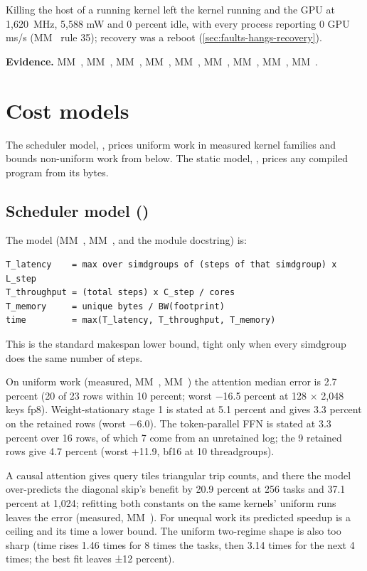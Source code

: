 Killing the host of a running kernel left the kernel running and the GPU at 1,620~MHz, 5,588 mW and 0 percent idle,
with every process reporting 0 GPU ms/s (MM~ rule 35); recovery was a reboot (\cref{sec:faults-hangs-recovery}).

\textbf{Evidence.} MM~, MM~, MM~, MM~, MM~, MM~, MM~, MM~, MM~.

\section{Cost models}\label{sec:cost-models-their}

The scheduler model, , prices uniform work in measured kernel families and bounds non-uniform work
from below. The static model, , prices any compiled program from its bytes.

\subsection*{Scheduler model ()}

The model (MM~, MM~, and the module docstring) is:

\begin{lstlisting}
T_latency    = max over simdgroups of (steps of that simdgroup) x L_step
T_throughput = (total steps) x C_step / cores
T_memory     = unique bytes / BW(footprint)
time         = max(T_latency, T_throughput, T_memory)
\end{lstlisting}

This is the standard makespan lower bound, tight only when every simdgroup does the same number of steps.

On uniform work (measured, MM~, MM~) the attention median error is 2.7 percent (20 of 23 rows within
10 percent; worst −16.5 percent at 128 × 2,048 keys fp8). Weight-stationary stage 1 is stated at 5.1 percent and gives
3.3 percent on the retained rows (worst −6.0). The token-parallel FFN is stated at 3.3 percent over 16 rows, of which 7
come from an unretained log; the 9 retained rows give 4.7 percent (worst +11.9, bf16 at 10 threadgroups).

A causal attention gives query tiles triangular trip counts, and there the model over-predicts the diagonal skip's
benefit by 20.9 percent at 256 tasks and 37.1 percent at 1,024; refitting both constants on the same kernels' uniform
runs leaves the error (measured, MM~). For unequal work its predicted speedup is a ceiling and its time a lower
bound. The uniform two-regime shape is also too sharp (time rises 1.46 times for 8 times the tasks, then 3.14 times
for the next 4 times; the best fit leaves ±12 percent).

